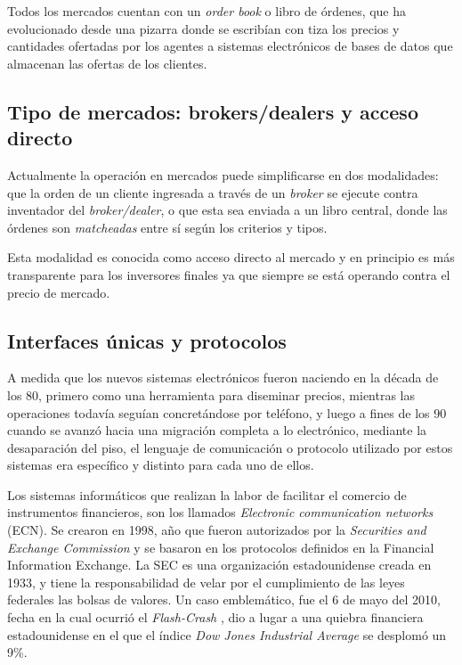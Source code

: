 Todos los mercados cuentan con un \emph{order book} o libro de órdenes, que ha
evolucionado desde una pizarra donde se escribían con tiza los precios y
cantidades ofertadas por los agentes a sistemas electrónicos de bases de datos
que almacenan las ofertas de los clientes.


\subsection{Tipo de mercados: brokers/dealers y acceso directo}

Actualmente la operación en mercados puede simplificarse en dos modalidades:
que la orden de un cliente ingresada a través de un \emph{broker} se ejecute
contra inventador del \emph{broker/dealer}, o que esta sea enviada a un libro
central, donde las órdenes son \emph{matcheadas} entre sí según los criterios y
tipos.

Esta modalidad es conocida como acceso directo al mercado y en principio es más 
transparente para los inversores finales ya que siempre se está operando contra 
el precio de mercado.


\subsection{Interfaces únicas y protocolos}
A medida que los nuevos sistemas electrónicos fueron naciendo en la década de
los 80, primero como una herramienta para diseminar precios, mientras las
operaciones todavía seguían concretándose por teléfono, y luego a fines de los
90 cuando se avanzó hacia una migración completa a lo electrónico, mediante la
desaparación del piso, el lenguaje de comunicación o protocolo utilizado por
estos sistemas era específico y distinto para cada uno de ellos.

Los sistemas informáticos que realizan la labor de facilitar el comercio de
instrumentos financieros, son los llamados \emph{Electronic communication
networks} (ECN).  Se crearon en 1998, año que fueron autorizados por la
\emph{Securities and Exchange Commission} y se basaron en los protocolos
definidos en la Financial Information Exchange. %
La SEC \cite{hasbrouck2004economic} es una organización estadounidense creada
en 1933, y tiene la responsabilidad de velar por el cumplimiento de las leyes
federales las bolsas de valores. Un caso emblemático, fue el 6 de mayo del
2010, fecha en la cual ocurrió el \emph{Flash-Crash} \cite{arndt2011high}, dio
a lugar a una quiebra financiera estadounidense en el que el índice \emph{Dow
Jones Industrial Average} se desplomó un 9\%. 

